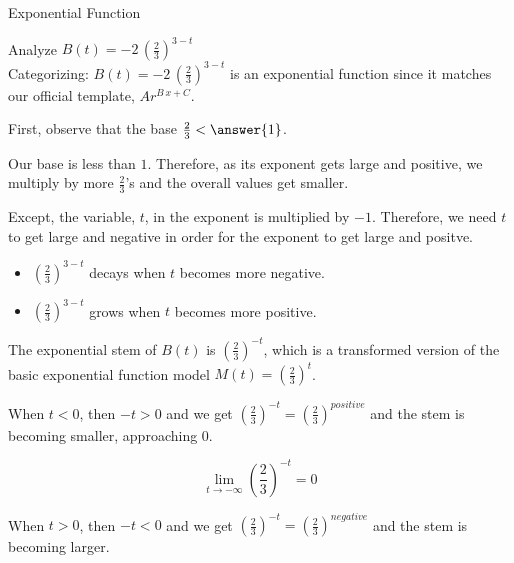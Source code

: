 \documentclass{ximera}
\begin{document}
\begin{example}  Exponential Function



Analyze   $B(t) = -2 \, \left( \frac{2}{3} \right)^{3-t}$ \\





Categorizing: $B(t) = -2 \, \left( \frac{2}{3} \right)^{3-t}$ is an exponential function since it matches our official template, $A r^{B \, x + C}$. \\


\begin{idea}


First, observe that the base $\frac{2}{3} < \answer{1}$.


Our base is less than $1$.  Therefore, as its exponent gets large and positive, we multiply by more $\frac{2}{3}$'s and the overall values get smaller.


Except, the variable, $t$, in the exponent is multiplied by $-1$.  Therefore, we need $t$ to get large and negative in order for the exponent to get large and positve.


\begin{itemize}
\item $\left( \frac{2}{3} \right)^{3-t}$ decays when $t$ becomes more negative.
\item $\left( \frac{2}{3} \right)^{3-t}$ grows when $t$ becomes more positive.
\end{itemize}






\begin{model}

The exponential stem of $B(t)$ is $\left( \frac{2}{3} \right)^{-t}$, which is a transformed version of the basic exponential function model $M(t) = \left( \frac{2}{3} \right)^{t}$.  



When $t < 0$, then $-t > 0$ and we get  $\left( \frac{2}{3} \right)^{-t} = \left( \frac{2}{3} \right)^{positive}$ and the stem is becoming smaller, approaching $0$.  





\[ \lim\limits_{t \to -\infty} \left( \frac{2}{3} \right)^{-t} = 0 \]



When $t > 0$, then $-t < 0$ and we get  $\left( \frac{2}{3} \right)^{-t} = \left( \frac{2}{3} \right)^{negative}$ and the stem is becoming larger.  




\end{model}
\end{idea}
\end{example}
\end{document}
